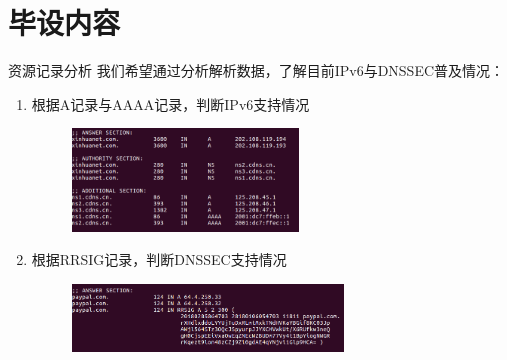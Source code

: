 \documentclass{beamer}
\begin{document}
\section{毕设内容}





\begin{frame}{资源记录分析}
  我们希望通过分析解析数据，了解目前IPv6与DNSSEC普及情况：
  \begin{enumerate}
    \item 根据A记录与AAAA记录，判断IPv6支持情况
    \begin{figure}
      \includegraphics[height=2.74cm,width=6cm]{images/aaaa.png}
    \end{figure} 

    \item 根据RRSIG记录，判断DNSSEC支持情况
    \begin{figure}
      \includegraphics[height=1.79cm,width=7.21cm]{images/dnssec.png}
    \end{figure} 
  \end{enumerate}

\end{frame}
\end{document}
